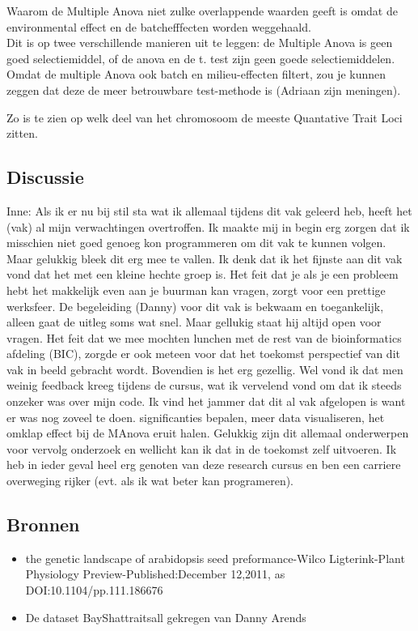\documentclass[12pt,a4paper]{article}
\begin{document}
Waarom de Multiple Anova niet zulke overlappende waarden geeft is omdat de environmental effect en de batchefffecten worden weggehaald.\\
Dit is op twee verschillende manieren uit te leggen: de Multiple Anova is geen goed selectiemiddel, of de anova en de t. test zijn geen goede selectiemiddelen.
Omdat de multiple Anova ook batch en milieu-effecten filtert, zou je kunnen zeggen dat deze de meer betrouwbare test-methode is (Adriaan zijn meningen).



Zo is te zien op welk deel van het chromosoom de meeste Quantative Trait Loci zitten.

\subsection*{Discussie}
Inne: Als ik er nu bij stil sta wat ik allemaal tijdens dit vak geleerd heb, heeft het (vak) al mijn verwachtingen overtroffen. Ik maakte mij in begin erg zorgen dat ik misschien niet goed genoeg kon programmeren om dit vak te kunnen volgen. Maar gelukkig bleek dit erg mee te vallen. Ik denk dat ik het fijnste aan dit vak vond dat het met een kleine hechte groep is. Het feit dat je als je een probleem hebt het makkelijk even aan je buurman kan vragen, zorgt voor een prettige werksfeer. De begeleiding (Danny) voor dit vak is bekwaam en toegankelijk, alleen gaat de uitleg soms wat snel. Maar gellukig staat hij altijd open voor vragen. Het feit dat we mee mochten lunchen met de rest van de bioinformatics afdeling (BIC), zorgde er ook meteen voor dat het toekomst perspectief van dit vak in beeld gebracht wordt. Bovendien is het erg gezellig. Wel vond ik dat men weinig feedback kreeg tijdens de cursus, wat ik vervelend vond om dat ik steeds onzeker was over mijn code.  Ik vind het jammer dat dit al vak afgelopen is want er was nog zoveel te doen. significanties bepalen, meer data visualiseren, het omklap effect bij de MAnova eruit halen. Gelukkig zijn dit allemaal onderwerpen voor vervolg onderzoek en wellicht kan ik dat in de toekomst zelf uitvoeren. Ik heb in ieder geval heel erg genoten van deze research cursus en ben een carriere overweging rijker (evt. als ik wat beter kan programeren).


\subsection*{Bronnen}
\begin{itemize}
\item the genetic landscape of arabidopsis seed preformance-Wilco Ligterink-Plant Physiology Preview-Published:December 12,2011, as DOI:10.1104/pp.111.186676\\
\item De dataset BayShattraitsall gekregen van Danny Arends
\end{itemize}
\end{document}
